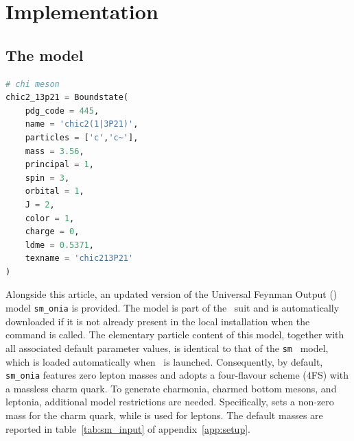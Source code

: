 \section{Implementation}
\label{sec:implementation}

\subsection[{The {\tt sm\_onia} {\ufo} model}]{The {} {\ufo} model}

\begin{lstlisting}[caption={\it\small Definitions of the $\chi_{c2}$ meson Fock state $^3\pwave_2^{[1]}$ in {\tt boundstates.py} of the updated \ufo\ model {\tt sm\_onia}.},captionpos=b,language=Python,label={lst:boundstates.py},float=tp,floatplacement=tbp]
# chi meson
chic2_13p21 = Boundstate(
    pdg_code = 445,
    name = 'chic2(1|3P21)',
    particles = ['c','c~'],
    mass = 3.56,
    principal = 1,
    spin = 3,
    orbital = 1,
    J = 2,
    color = 1,
    charge = 0,
    ldme = 0.5371,
    texname = 'chic213P21'
)
\end{lstlisting}

Alongside this article, an updated version of the Universal Feynman Output (\ufo)~\cite{Degrande:2011ua,Darme:2023jdn} model \texttt{sm\_onia} is provided. 
The model is part of the \mgshort\ suit and is automatically downloaded if it is not already present in the local installation when the command
\noindent
is called.
The elementary particle content of this model, together with all associated default parameter values, is identical to that of the {\tt sm} \ufo\ model, which is loaded automatically when \mgshort\ is launched. Consequently, by default, \texttt{sm\_onia} features zero lepton masses and adopts a four-flavour scheme ($4$FS) with a massless charm quark. To generate charmonia, charmed bottom mesons, and leptonia, additional model restrictions are needed. Specifically, 
\noindent
sets a non-zero mass for the charm quark, while
\noindent
is used for leptons. The default masses are reported in table~\ref{tab:sm_input} of appendix~\ref{app:setup}.

